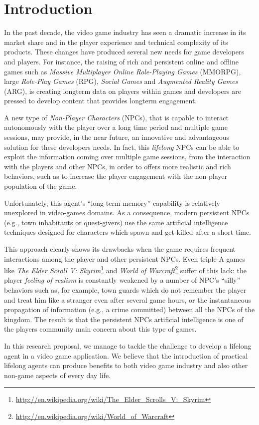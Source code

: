 \section{Introduction}\label{sect:introduction}

In the past decade, the video game industry has seen a dramatic increase in its market share and in the player experience and technical complexity of its products. These changes have produced several new needs for game developers and players. For instance, the raising of rich and persistent online and offline games such as \emph{Massive Multiplayer Online Role-Playing Games} (MMORPG), large \emph{Role-Play Games} (RPG), \emph{Social Games} and \emph{Augmented Reality Games} (ARG), is creating longterm data on players within games and developers are pressed to develop content that provides longterm engagement. 

A new type of \emph{Non-Player Characters} (NPCs), that is capable to interact autonomously with the player over a long time period and multiple game sessions, may provide, in the near future, an innovative and advantageous solution for these developers needs. In fact, this \emph{lifelong} NPCs can be able to exploit the information coming over multiple game sessions, from the interaction with the players and other NPCs, in order to offers more realistic and rich behaviors, such as to increase the player engagement with the non-player population of the game.

Unfortunately, this agent's ``long-term memory'' capability is relatively unexplored in video-games domains. As a consequence, modern persistent NPCs (e.g., town inhabitants or quest-givers) use the same artificial intelligence techniques designed for characters which spawn and get killed after a short time.

This approach clearly shows its drawbacks when the game requires frequent interactions among the player and other persistent NPCs. Even triple-A games like \emph{The Elder Scroll V: Skyrim}\footnote{\url{http://en.wikipedia.org/wiki/The_Elder_Scrolls_V:_Skyrim}} and \emph{World of Warcraft}\footnote{\url{http://en.wikipedia.org/wiki/World_of_Warcraft}} suffer of this lack: the player \emph{feeling of realism} is constantly  weakened by a number of NPC's ``silly'' behaviors such as, for example, town guards which do not remember the player and treat him like a stranger even after several game hours, or the instantaneous propagation of information (e.g., a crime committed) between all the NPCs of the kingdom. The result is that the persistent NPCs artificial intelligence is one of the players community main concern about this type of games.

In this research proposal, we manage to tackle the challenge to develop a lifelong agent in a video game application. We believe that the introduction of practical lifelong agents can produce benefits to both video game industry and also other non-game aspects of every day life.